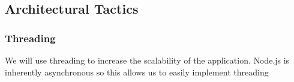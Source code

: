 \subsection{Architectural Tactics}
\subsubsection{Threading}
We will use threading to increase the scalability of the application. Node.js is inherently asynchronous so this allows us to easily implement threading